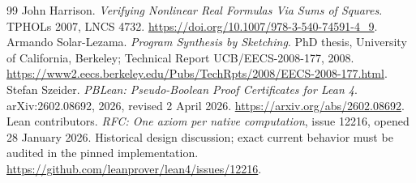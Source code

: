 \documentclass[11pt,letterpaper]{article}
\theoremstyle{definition}\newtheorem{definition}[proposition]{Definition}
\begin{document}
\begin{thebibliography}{99}
 John Harrison. \emph{Verifying Nonlinear Real Formulas Via Sums of Squares}. TPHOLs 2007, LNCS 4732. \url{https://doi.org/10.1007/978-3-540-74591-4_9}.
 Armando Solar-Lezama. \emph{Program Synthesis by Sketching}. PhD thesis, University of California, Berkeley; Technical Report UCB/EECS-2008-177, 2008. \url{https://www2.eecs.berkeley.edu/Pubs/TechRpts/2008/EECS-2008-177.html}.
 Stefan Szeider. \emph{PBLean: Pseudo-Boolean Proof Certificates for Lean 4}. arXiv:2602.08692, 2026, revised 2 April 2026. \url{https://arxiv.org/abs/2602.08692}.
 Lean contributors. \emph{RFC: One axiom per native computation}, issue 12216, opened 28 January 2026. Historical design discussion; exact current behavior must be audited in the pinned implementation. \url{https://github.com/leanprover/lean4/issues/12216}.
\end{thebibliography}
\end{document}

